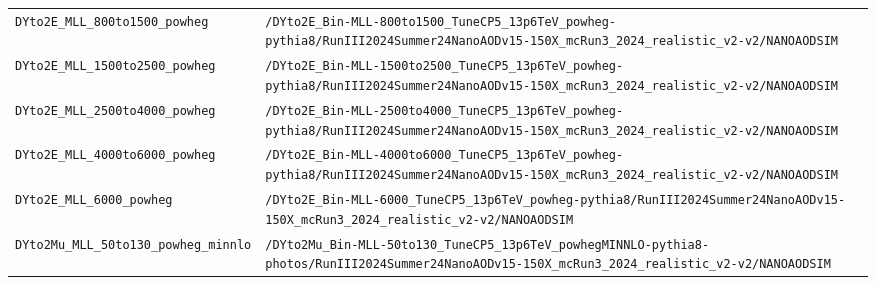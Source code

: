 \begin{longtable}{@{}>{\RaggedRight\arraybackslash}p{} >{\RaggedRight\arraybackslash}p{}@{}}
\addlinespace[2pt]
\texttt{DYto2E\_\allowbreak{}MLL\_\allowbreak{}800to1500\_\allowbreak{}powheg} & \texttt{/\allowbreak{}DYto2E\_\allowbreak{}Bin-\allowbreak{}MLL-\allowbreak{}800to1500\_\allowbreak{}TuneCP5\_\allowbreak{}13p6TeV\_\allowbreak{}powheg-\allowbreak{}pythia8/\allowbreak{}RunIII2024Summer24NanoAODv15-\allowbreak{}150X\_\allowbreak{}mcRun3\_\allowbreak{}2024\_\allowbreak{}realistic\_\allowbreak{}v2-\allowbreak{}v2/\allowbreak{}NANOAODSIM} \\
\addlinespace[2pt]
\texttt{DYto2E\_\allowbreak{}MLL\_\allowbreak{}1500to2500\_\allowbreak{}powheg} & \texttt{/\allowbreak{}DYto2E\_\allowbreak{}Bin-\allowbreak{}MLL-\allowbreak{}1500to2500\_\allowbreak{}TuneCP5\_\allowbreak{}13p6TeV\_\allowbreak{}powheg-\allowbreak{}pythia8/\allowbreak{}RunIII2024Summer24NanoAODv15-\allowbreak{}150X\_\allowbreak{}mcRun3\_\allowbreak{}2024\_\allowbreak{}realistic\_\allowbreak{}v2-\allowbreak{}v2/\allowbreak{}NANOAODSIM} \\
\addlinespace[2pt]
\texttt{DYto2E\_\allowbreak{}MLL\_\allowbreak{}2500to4000\_\allowbreak{}powheg} & \texttt{/\allowbreak{}DYto2E\_\allowbreak{}Bin-\allowbreak{}MLL-\allowbreak{}2500to4000\_\allowbreak{}TuneCP5\_\allowbreak{}13p6TeV\_\allowbreak{}powheg-\allowbreak{}pythia8/\allowbreak{}RunIII2024Summer24NanoAODv15-\allowbreak{}150X\_\allowbreak{}mcRun3\_\allowbreak{}2024\_\allowbreak{}realistic\_\allowbreak{}v2-\allowbreak{}v2/\allowbreak{}NANOAODSIM} \\
\addlinespace[2pt]
\texttt{DYto2E\_\allowbreak{}MLL\_\allowbreak{}4000to6000\_\allowbreak{}powheg} & \texttt{/\allowbreak{}DYto2E\_\allowbreak{}Bin-\allowbreak{}MLL-\allowbreak{}4000to6000\_\allowbreak{}TuneCP5\_\allowbreak{}13p6TeV\_\allowbreak{}powheg-\allowbreak{}pythia8/\allowbreak{}RunIII2024Summer24NanoAODv15-\allowbreak{}150X\_\allowbreak{}mcRun3\_\allowbreak{}2024\_\allowbreak{}realistic\_\allowbreak{}v2-\allowbreak{}v2/\allowbreak{}NANOAODSIM} \\
\addlinespace[2pt]
\texttt{DYto2E\_\allowbreak{}MLL\_\allowbreak{}6000\_\allowbreak{}powheg} & \texttt{/\allowbreak{}DYto2E\_\allowbreak{}Bin-\allowbreak{}MLL-\allowbreak{}6000\_\allowbreak{}TuneCP5\_\allowbreak{}13p6TeV\_\allowbreak{}powheg-\allowbreak{}pythia8/\allowbreak{}RunIII2024Summer24NanoAODv15-\allowbreak{}150X\_\allowbreak{}mcRun3\_\allowbreak{}2024\_\allowbreak{}realistic\_\allowbreak{}v2-\allowbreak{}v2/\allowbreak{}NANOAODSIM} \\
\addlinespace[2pt]
\texttt{DYto2Mu\_\allowbreak{}MLL\_\allowbreak{}50to130\_\allowbreak{}powheg\_\allowbreak{}minnlo} & \texttt{/\allowbreak{}DYto2Mu\_\allowbreak{}Bin-\allowbreak{}MLL-\allowbreak{}50to130\_\allowbreak{}TuneCP5\_\allowbreak{}13p6TeV\_\allowbreak{}powhegMINNLO-\allowbreak{}pythia8-\allowbreak{}photos/\allowbreak{}RunIII2024Summer24NanoAODv15-\allowbreak{}150X\_\allowbreak{}mcRun3\_\allowbreak{}2024\_\allowbreak{}realistic\_\allowbreak{}v2-\allowbreak{}v2/\allowbreak{}NANOAODSIM} \\

\end{longtable}
